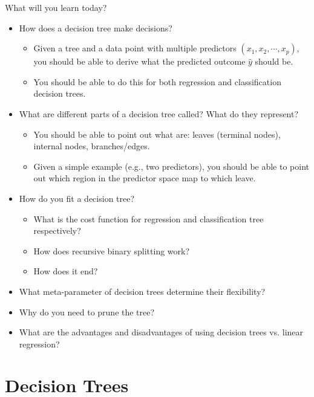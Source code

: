 \documentclass[aspectratio=169,usenames,dvipsnames]{beamer}
\begin{document}
\begin{frame}[t]{What will you learn today?}
\begin{itemize}
	\item How does a decision tree make decisions?
		\begin{itemize}
			\item Given a tree and a data point with multiple predictors $(x_1, x_2,\cdots, x_p)$, you should be able to derive what the predicted outcome $\hat{y}$ should be.
			\item You should be able to do this for both regression and classification decision trees.
		\end{itemize}
	\item What are different parts of a decision tree called? What do they represent?
		\begin{itemize}
			\item You should be able to point out what are: leaves (terminal nodes), internal nodes, branches/edges.
			\item Given a simple example (e.g., two predictors), you should be able to point out which region in the predictor space map to which leave.
		\end{itemize}
	\item How do you fit a decision tree?
		\begin{itemize}
			\item What is the cost function for regression and classification tree respectively?
			\item How does recursive binary splitting work?
			\item How does it end?
		\end{itemize}
	\item What meta-parameter of decision trees determine their flexibility?
	\item Why do you need to prune the tree?
	\item What are the advantages and disadvantages of using decision trees vs. linear regression?
\end{itemize}
\end{frame}


\section{Decision Trees}
\end{document}
